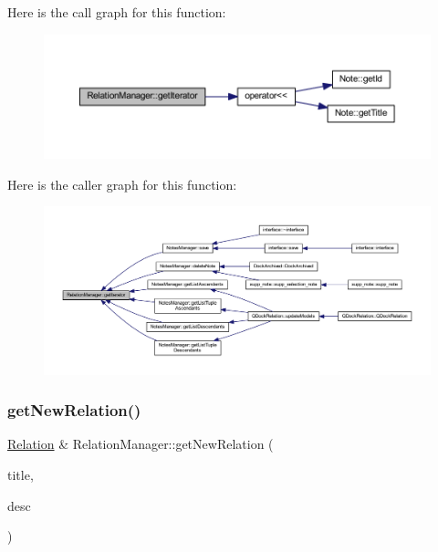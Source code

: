 Here is the call graph for this function\+:\nopagebreak
\begin{figure}[H]
\begin{center}
\leavevmode
\includegraphics[width=350pt]{class_relation_manager_a467cb7895b238376feaac142cdec5dab_cgraph}
\end{center}
\end{figure}
Here is the caller graph for this function\+:\nopagebreak
\begin{figure}[H]
\begin{center}
\leavevmode
\includegraphics[width=350pt]{class_relation_manager_a467cb7895b238376feaac142cdec5dab_icgraph}
\end{center}
\end{figure}
\mbox{\label{class_relation_manager_a1f9d556e0505105205e1fdb4905c4a80}} 
\subsubsection{\texorpdfstring{get\+New\+Relation()}{getNewRelation()}}
{\footnotesize\ttfamily \hyperlink{class_relation}{Relation} \& Relation\+Manager\+::get\+New\+Relation (\begin{DoxyParamCaption}\item[{const Q\+String \&}]{title,  }\item[{const Q\+String \&}]{desc }\end{DoxyParamCaption})}



